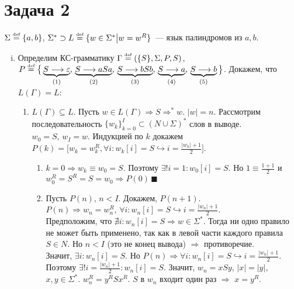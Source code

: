 \documentclass[a4paper]{article}
\def\eqdef{\overset{\mbox{\tiny def}}{=}}
\begin{document}
{\section*{Задача 2}
$\Sigma\eqdef\{a,b\}$, $\Sigma^*\supset L\eqdef\{w\in\Sigma^*\big|w=w^R\}$~--- язык палиндромов из $a,b$.
\begin{enumerate}[i.]
\def\ansba{$\Gamma\eqdef(\{S\},\Sigma,P,S)$, $P\eqdef\big\{\underbrace{S\longrightarrow\varepsilon}_{(1)},\,\underbrace{S\longrightarrow aSa}_{(2)},\,\underbrace{S\longrightarrow bSb}_{(3)},\,\underbrace{S\longrightarrow a}_{(4)},\,\underbrace{S\longrightarrow b}_{(5)}\big\}$}
\def\ansbac{\Gamma\eqdef(\{S\},\Sigma,P,S)$, $P\eqdef\big\{S\longrightarrow\varepsilon\big|aSa\big|bSb\big|a\big|b\big\}}
\item Определим КС-грамматику \ansba.\newline
Докажем, что $L(\Gamma)=L$:
\begin{enumerate}
\item $L(\Gamma)\subseteq L$. Пусть $w\in L(\Gamma)\Rightarrow S\Longrightarrow^* w$. $|w|=n$. Рассмотрим последовательность $\{w_k\}^I_{k=0}\subset (N\cup\Sigma)^*$ слов в выводе. $w_0=S,\,w_I=w$. Индукцией по $k$ докажем $P(k)=\big[w_k=w_k^R,\forall i\colon w_k[i]=S\hookrightarrow i=\frac{|w_k|+1}{2}\big]$.\begin{enumerate}[1.]
\item $k=0\Rightarrow w_k\equiv w_0=S$. Поэтому $\exists ! i=1\colon w_0[i]=S$. Но $1\equiv\frac{1+1}{2}$ и $w_0^R=S^R=S=w_0\Rightarrow P(0)\,\blacksquare$
\item Пусть $P(n),\,n<I$. Докажем, $P(n+1)$. $P(n)\Rightarrow w_n=w_n^R,\,\forall i\colon w_n[i]=S\hookrightarrow i=\frac{|w_n|+1}{2}$.
\\[1pt]
Предположим, что $\nexists i\colon w_n[i]=S\Rightarrow w\in \Sigma^*$. Тогда ни одно правило не может быть применено, так как в левой части каждого правила $S\in N$. Но $n<I$ (это не конец вывода) $\Rightarrow$ противоречие.
\\[1pt]
Значит, $\exists i\colon w_n[i]=S$. Но $P(n)\Rightarrow \forall i\colon w_n[i]=S\hookrightarrow i=\frac{|w_n|+1}{2}$. Поэтому $\exists!i=\frac{|w_n|+1}{2}\colon w_n[i]=S$. Значит, $w_n=xSy$, $|x|=|y|$, $x,y\in\Sigma^*$. $w_n^R=y^RSx^R$. $S$ в $w_n$ входит один раз $\Rightarrow$ $x=y^R$.\newline

\end{enumerate}
\end{enumerate}
\end{enumerate}}
\end{document}

